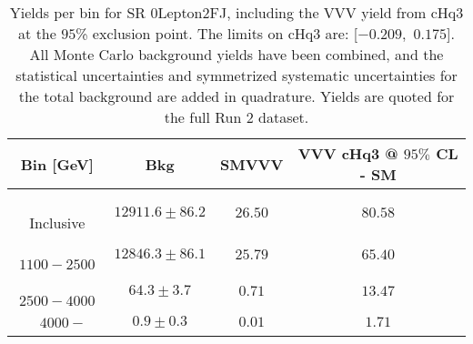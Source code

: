 \begin{table}[!htbp]
    \small
    \center
    \begin{tabular}{c||c|c|c}
    Bin [GeV] & Bkg & SMVVV & \pbox{20cm}{VVV \\ cHq3 @ $95\%$ CL - SM \\ }\\
    \hline
    \pbox{20cm}{ ~ \\Inclusive\\ } & $12911.6 \pm 86.2$ & $26.50$ & $80.58$\\
    \hline
    \pbox{20cm}{ ~ \\$1100-2500$\\ } & $12846.3 \pm 86.1$ & $25.79$ & $65.40$\\
    \hline
    \pbox{20cm}{ ~ \\$2500-4000$\\ } & $64.3 \pm 3.7$ & $0.71$ & $13.47$\\
    \hline
    \pbox{20cm}{ ~ \\$4000-$\\ } & $0.9 \pm 0.3$ & $0.01$ & $1.71$\\
\end{tabular}
    \caption{Yields per bin for SR 0Lepton2FJ, including the VVV yield from cHq3 at the $95$\% exclusion point. The limits on cHq3 are: [$-0.209$,~$0.175$]. All Monte Carlo background yields have been combined, and the statistical uncertainties and symmetrized systematic uncertainties for the total background are added in quadrature. Yields are quoted for the full Run 2 dataset.}
    \label{tab:0Lepton2FJ$binssignal}
\end{table}
